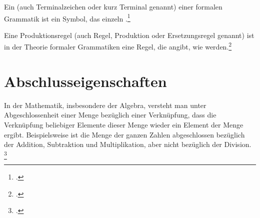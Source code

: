 \documentclass{bschlangaul-theorie}
\begin{document}
%

Ein  (auch Terminalzeichen oder kurz Terminal
genannt) einer formalen Grammatik ist ein Symbol, das einzeln
.\footcite{wiki:terminal}

Eine Produktionsregel (auch Regel, Produktion oder Ersetzungsregel
genannt) ist in der Theorie formaler Grammatiken eine Regel, die angibt,
wie  werden.\footcite{wiki:produktionsregel}

%

\section{Abschlusseigenschaften}

In der Mathematik, insbesondere der Algebra, versteht man unter
Abgeschlossenheit einer Menge bezüglich einer Verknüpfung, dass die
Verknüpfung beliebiger Elemente dieser Menge wieder ein Element der
Menge ergibt. Beispielsweise ist die Menge der ganzen Zahlen
abgeschlossen bezüglich der Addition, Subtraktion und Multiplikation,
aber nicht bezüglich der Division.
\footcite{wiki:abgeschlossenheit}
\end{document}

